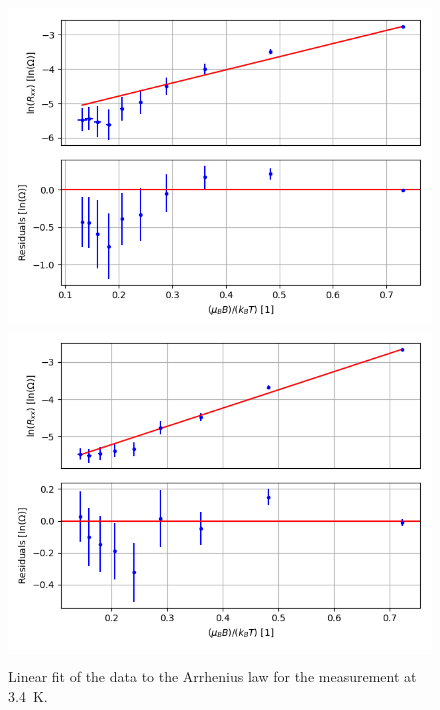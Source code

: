 \documentclass[12pt,a4paper]{article}
\begin{document}
\begin{figure} [H]
\centering
\includegraphics[scale=0.5]{Bilder/Elektron_g/3_6/lin_fit_Arrhenius_law_1.PNG}
\includegraphics[scale=0.5]{Bilder/Elektron_g/3_6/lin_fit_Arrhenius_law_2.PNG}
\caption{Linear fit of the data to the Arrhenius law for the measurement at \SI{3.4}{K}.}
\end{figure}
\end{document}

